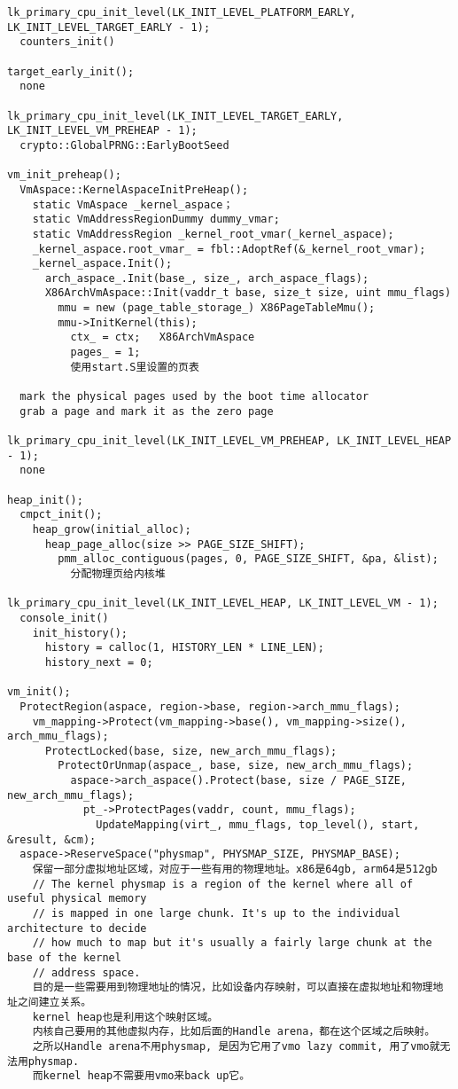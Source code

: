 \begin{verbatim}
lk_primary_cpu_init_level(LK_INIT_LEVEL_PLATFORM_EARLY, LK_INIT_LEVEL_TARGET_EARLY - 1);
  counters_init()

target_early_init();
  none

lk_primary_cpu_init_level(LK_INIT_LEVEL_TARGET_EARLY, LK_INIT_LEVEL_VM_PREHEAP - 1);
  crypto::GlobalPRNG::EarlyBootSeed

vm_init_preheap();
  VmAspace::KernelAspaceInitPreHeap();
    static VmAspace _kernel_aspace；
    static VmAddressRegionDummy dummy_vmar;
    static VmAddressRegion _kernel_root_vmar(_kernel_aspace);
    _kernel_aspace.root_vmar_ = fbl::AdoptRef(&_kernel_root_vmar);
    _kernel_aspace.Init();
      arch_aspace_.Init(base_, size_, arch_aspace_flags);
      X86ArchVmAspace::Init(vaddr_t base, size_t size, uint mmu_flags)
        mmu = new (page_table_storage_) X86PageTableMmu();
        mmu->InitKernel(this);
          ctx_ = ctx;   X86ArchVmAspace
          pages_ = 1;
          使用start.S里设置的页表

  mark the physical pages used by the boot time allocator
  grab a page and mark it as the zero page

lk_primary_cpu_init_level(LK_INIT_LEVEL_VM_PREHEAP, LK_INIT_LEVEL_HEAP - 1);
  none

heap_init();
  cmpct_init();
    heap_grow(initial_alloc);
      heap_page_alloc(size >> PAGE_SIZE_SHIFT);
        pmm_alloc_contiguous(pages, 0, PAGE_SIZE_SHIFT, &pa, &list);
          分配物理页给内核堆

lk_primary_cpu_init_level(LK_INIT_LEVEL_HEAP, LK_INIT_LEVEL_VM - 1);
  console_init()
    init_history();
      history = calloc(1, HISTORY_LEN * LINE_LEN);
      history_next = 0;

vm_init();
  ProtectRegion(aspace, region->base, region->arch_mmu_flags);
    vm_mapping->Protect(vm_mapping->base(), vm_mapping->size(), arch_mmu_flags);
      ProtectLocked(base, size, new_arch_mmu_flags);
        ProtectOrUnmap(aspace_, base, size, new_arch_mmu_flags);
          aspace->arch_aspace().Protect(base, size / PAGE_SIZE, new_arch_mmu_flags);
            pt_->ProtectPages(vaddr, count, mmu_flags);
              UpdateMapping(virt_, mmu_flags, top_level(), start, &result, &cm);
  aspace->ReserveSpace("physmap", PHYSMAP_SIZE, PHYSMAP_BASE);
    保留一部分虚拟地址区域，对应于一些有用的物理地址。x86是64gb, arm64是512gb
    // The kernel physmap is a region of the kernel where all of useful physical memory
    // is mapped in one large chunk. It's up to the individual architecture to decide
    // how much to map but it's usually a fairly large chunk at the base of the kernel
    // address space.
    目的是一些需要用到物理地址的情况，比如设备内存映射，可以直接在虚拟地址和物理地址之间建立关系。
    kernel heap也是利用这个映射区域。
    内核自己要用的其他虚拟内存，比如后面的Handle arena，都在这个区域之后映射。
    之所以Handle arena不用physmap, 是因为它用了vmo lazy commit, 用了vmo就无法用physmap.
    而kernel heap不需要用vmo来back up它。


\end{verbatim}
